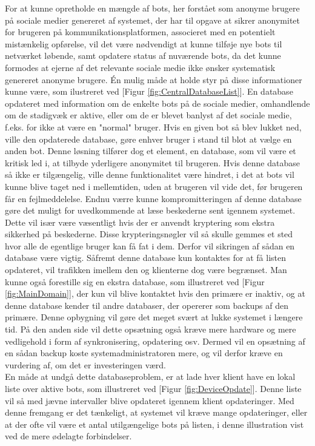 For at kunne opretholde en mængde af bots, her forstået som anonyme brugere på sociale medier genereret af systemet, der har til opgave at sikrer anonymitet for brugeren på kommunikationsplatformen, associeret med en potentielt mistænkelig opførelse, vil det være nødvendigt at kunne tilføje nye bots til netværket løbende, samt opdatere status af nuværende bots, da det kunne formodes at ejerne af det relevante sociale medie ikke ønsker systematisk genereret anonyme brugere. Én mulig måde at holde styr på disse informationer kunne være, som ilustreret ved [Figur \ref{fig:CentralDatabaseList}]. En database opdateret med information om de enkelte bots på de sociale medier, omhandlende om de stadigvæk er aktive, eller om de er blevet banlyst af det sociale medie, f.eks. for ikke at være en "normal" bruger. Hvis en given bot så blev lukket ned, ville den opdaterede database, gøre enhver bruger i stand til blot at vælge en anden bot. Denne løsning tilfører dog et element, en database, som vil være et kritisk led i, at tilbyde yderligere anonymitet til brugeren. Hvis denne database så ikke er tilgængelig, ville denne funktionalitet være hindret, i det at bots vil kunne blive taget ned i mellemtiden, uden at brugeren vil vide det, før brugeren får en fejlmeddelelse. Endnu værre kunne kompromitteringen af denne database gøre det muligt for uvedkommende at læse beskederne sent igennem systemet. Dette vil især være væsentligt hvis der er anvendt kryptering som ekstra sikkerhed på beskederne. Disse krypteringsnøgler vil så skulle gemmes et sted hvor alle de egentlige bruger kan få fat i dem. Derfor vil sikringen af sådan en database være vigtig. Såfremt denne database kun kontaktes for at få listen opdateret, vil trafikken imellem den og klienterne dog være begrænset. Man kunne også forestille sig en ekstra database, som illustreret ved [Figur \ref{fig:MainDomain}], der kun vil blive kontaktet hvis den primære er inaktiv, og at denne database kender til andre databaser, der opererer som backups af den primære. Denne opbygning vil gøre det meget svært at lukke systemet i længere tid. På den anden side vil dette opsætning også kræve mere hardware og mere vedligehold i form af synkronisering, opdatering osv. Dermed vil en opsætning af en sådan backup koste systemadministratoren mere, og vil derfor kræve en vurdering af, om det er investeringen værd.\\
En måde at undgå dette databaseproblem, er at lade hver klient have en lokal liste over aktive bots, som illustreret ved [Figur \ref{fig:DeviceOpdate}]. Denne liste vil så med jævne intervaller blive opdateret igennem klient opdateringer. Med denne fremgang er det tænkeligt, at systemet vil kræve mange opdateringer, eller at der ofte vil være et antal utilgængelige bots på listen, i denne illustration vist ved de mere ødelagte forbindelser.
